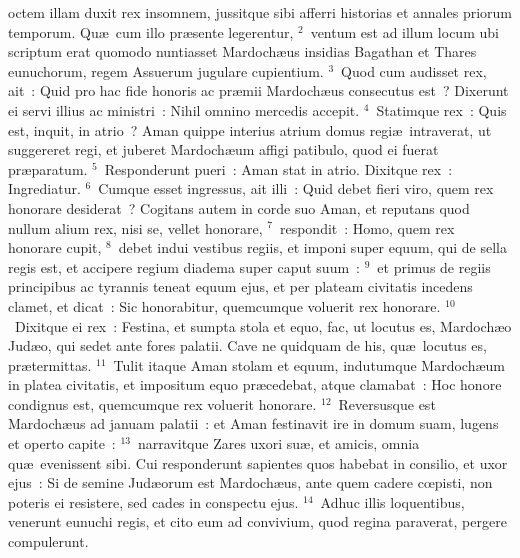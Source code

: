 \bchapter
{}octem illam duxit rex insomnem, jussitque sibi afferri historias et annales priorum temporum. Qu\ae\ cum illo pr\ae sente legerentur,
${}^{2}$~ventum est ad illum locum ubi scriptum erat quomodo nuntiasset Mardoch\ae us insidias Bagathan et Thares eunuchorum, regem Assuerum jugulare cupientium.
${}^{3}$~Quod cum audisset rex, ait~: Quid pro hac fide honoris ac pr\ae mii Mardoch\ae us consecutus est~? Dixerunt ei servi illius ac ministri~: Nihil omnino mercedis accepit.
${}^{4}$~Statimque rex~: Quis est, inquit, in atrio~? Aman quippe interius atrium domus regi\ae\ intraverat, ut suggereret regi, et juberet Mardoch\ae um affigi patibulo, quod ei fuerat pr\ae paratum.
${}^{5}$~Responderunt pueri~: Aman stat in atrio. Dixitque rex~: Ingrediatur.
${}^{6}$~Cumque esset ingressus, ait illi~: Quid debet fieri viro, quem rex honorare desiderat~? Cogitans autem in corde suo Aman, et reputans quod nullum alium rex, nisi se, vellet honorare,
${}^{7}$~respondit~: Homo, quem rex honorare cupit,
${}^{8}$~debet indui vestibus regiis, et imponi super equum, qui de sella regis est, et accipere regium diadema super caput suum~:
${}^{9}$~et primus de regiis principibus ac tyrannis teneat equum ejus, et per plateam civitatis incedens clamet, et dicat~: Sic honorabitur, quemcumque voluerit rex honorare.
${}^{10}$~Dixitque ei rex~: Festina, et sumpta stola et equo, fac, ut locutus es, Mardoch\ae o Jud\ae o, qui sedet ante fores palatii. Cave ne quidquam de his, qu\ae\ locutus es, pr\ae termittas.
${}^{11}$~Tulit itaque Aman stolam et equum, indutumque Mardoch\ae um in platea civitatis, et impositum equo pr\ae cedebat, atque clamabat~: Hoc honore condignus est, quemcumque rex voluerit honorare.
${}^{12}$~Reversusque est Mardoch\ae us ad januam palatii~: et Aman festinavit ire in domum suam, lugens et operto capite~:
${}^{13}$~narravitque Zares uxori su\ae , et amicis, omnia qu\ae\ evenissent sibi. Cui responderunt sapientes quos habebat in consilio, et uxor ejus~: Si de semine Jud\ae orum est Mardoch\ae us, ante quem cadere cœpisti, non poteris ei resistere, sed cades in conspectu ejus.
${}^{14}$~Adhuc illis loquentibus, venerunt eunuchi regis, et cito eum ad convivium, quod regina paraverat, pergere compulerunt.

